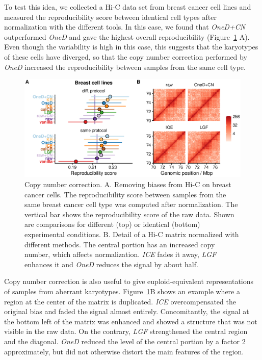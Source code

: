 \documentclass[a4,center,fleqn]{NAR}
\providecommand{\DIFadd}[1]{{\protect\color{red}#1}} %
\providecommand{\DIFdel}[1]{{\protect}}                      %
\providecommand{\DIFaddbegin}{} %
\providecommand{\DIFaddend}{} %
\providecommand{\DIFdelbegin}{} %
\providecommand{\DIFdelend}{} %
\providecommand{\DIFaddFL}[1]{\DIFadd{#1}} %
\begin{document}
\DIFadd{To test this idea, we collected a Hi-C data set from breast cancer cell
lines and measured the reproducibility score between identical cell types
after normalization with the different tools. In this case, we found that
}\textit{\DIFadd{OneD+CN}} \DIFadd{outperformed }\textit{\DIFadd{OneD}} \DIFadd{and gave the highest overall
reproducibility }\DIFaddend (Figure~\ref{fig:cnv_correction}\DIFdelbegin \DIFdel{). In
this example, }\textit{\DIFdel{ICE}} %
\DIFdel{overcompensated the original bias }\DIFdelend \DIFaddbegin \DIFadd{A). Even though the
variability is high in this case, this suggests that the karyotypes of
these cells have diverged, so that the copy number correction performed by
}\textit{\DIFadd{OneD}} \DIFadd{increased the reproducibility between samples from the same
cell type.
}

\begin{figure}
\centerline{\includegraphics[width=.49\textwidth]
  {nar_figures/figure_4.eps}}
\caption{\DIFaddFL{Copy number correction. A. Removing biases from Hi-C on breast
cancer cells. The reproducibility score between samples from the same
breast cancer cell type was computed after normalization. The vertical bar
shows the reproducibility score of the raw data. Shown are comparisons for
different (top) or identical (bottom) experimental conditions. B. Detail
of a Hi-C matrix normalized with different methods. The central portion
has an increased copy number, which affects normalization. }\textit{\DIFaddFL{ICE}}
\DIFaddFL{fades it away, }\textit{\DIFaddFL{LGF}} \DIFaddFL{enhances it and }\textit{\DIFaddFL{OneD}} \DIFaddFL{reduces the
signal by about half.}}
\label{fig:cnv_correction}
\end{figure}

\DIFadd{Copy number correction is also useful to give euploid-equivalent
representations of samples from aberrant karyotypes.
Figure~\ref{fig:cnv_correction}B shows an example where a region }\DIFaddend at the
center of the \DIFdelbegin \DIFdel{picture }\DIFdelend \DIFaddbegin \DIFadd{matrix is duplicated. }\textit{\DIFadd{ICE}} \DIFadd{overcompensated the
original bias }\DIFaddend and faded the signal almost entirely. Concomitantly, the
signal at the bottom left of the matrix was enhanced and showed a
structure that was not visible in the raw data. On the contrary,
\textit{LGF} strengthened the central region and the diagonal.
\textit{OneD} reduced the level of the central portion by a factor 2
approximately, but did not otherwise distort the main features of the
region.
\DIFdelbegin \DIFdel{This example shows that the copy number does not have a simple and predictable effect on the final matrix. Not taking it into account may
open the door to some normalization artifacts. }\DIFdelend 
\end{document}
